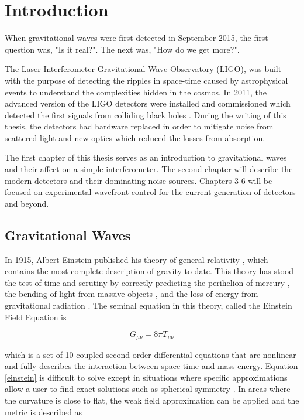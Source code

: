 \chapter{Introduction}\label{intro}

	When gravitational waves were first detected in September 2015, the first question was, "Is it real?". The next was, "How do we get more?".
	
	The Laser Interferometer Gravitational-Wave Observatory (LIGO), was built with the purpose of detecting the ripples in space-time caused by astrophysical events to understand the complexities hidden in the cosmos.  In 2011, the advanced version of the LIGO detectors were installed and commissioned which detected the first signals from colliding black holes \cite{DetectionPaper}.  During the writing of this thesis, the detectors had hardware replaced in order to mitigate noise from scattered light and new optics which reduced the losses from absorption.
	
	The first chapter of this thesis serves as an introduction to gravitational waves and their affect on a simple interferometer. The second chapter will describe the modern detectors and their dominating noise sources.  Chapters 3-6 will be focused on experimental wavefront control for the current generation of detectors and beyond.

	\section{Gravitational Waves}\label{gravitational waves}
	In 1915, Albert Einstein published his theory of general relativity \cite{einstein}, which contains the most complete description of gravity to date.  This theory has stood the test of time and scrutiny by correctly predicting the perihelion of mercury \cite{Einstein_GR}, the bending of light from massive objects \cite{DysonEddington}, and the loss of energy from gravitational radiation \cite{HulseTaylor}. The seminal equation in this theory, called the Einstein Field Equation is
	
	\begin{equation} \label{einstein}
	G_{\mu \nu} = 8 \pi T_{\mu \nu}
	\end{equation}
	
	which is a set of 10 coupled second-order differential equations that are nonlinear and fully describes the interaction between space-time and mass-energy. Equation \ref{einstein} is difficult to solve except in situations where specific approximations allow a user to find exact solutions such as spherical symmetry \cite{carroll_2003} \cite{schutz_2009}. In areas where the curvature is close to flat,  the weak field approximation can be applied and the metric is described as	
	
